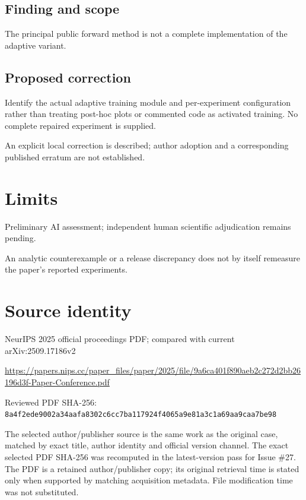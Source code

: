 \documentclass[11pt]{article}
\begin{document}
\subsection*{Finding and scope}

The principal public forward method is not a complete implementation of the adaptive variant.

\subsection*{Proposed correction}

Identify the actual adaptive training module and per-experiment configuration rather than treating post-hoc plots or commented code as activated training. No complete repaired experiment is supplied.

An explicit local correction is described; author adoption and a corresponding published erratum are not established.

\section*{Limits}

Preliminary AI assessment; independent human scientific adjudication remains pending.\par

An analytic counterexample or a release discrepancy does not by itself remeasure the paper’s reported experiments.\par

\section*{Source identity}

NeurIPS 2025 official proceedings PDF; compared with current arXiv:2509.17186v2

\url{https://papers.nips.cc/paper_files/paper/2025/file/9a6ca401f890aeb2c272d2bb26196d3f-Paper-Conference.pdf}

Reviewed PDF SHA-256: \nolinkurl{8a4f2ede9002a34aafa8302c6cc7ba117924f4065a9e81a3c1a69aa9caa7be98}

The selected author/publisher source is the same work as the original case, matched by exact title, author identity and official version channel. The exact selected PDF SHA-256 was recomputed in the latest-version pass for Issue \#27. The PDF is a retained author/publisher copy; its original retrieval time is stated only when supported by matching acquisition metadata. File modification time was not substituted.
\end{document}
